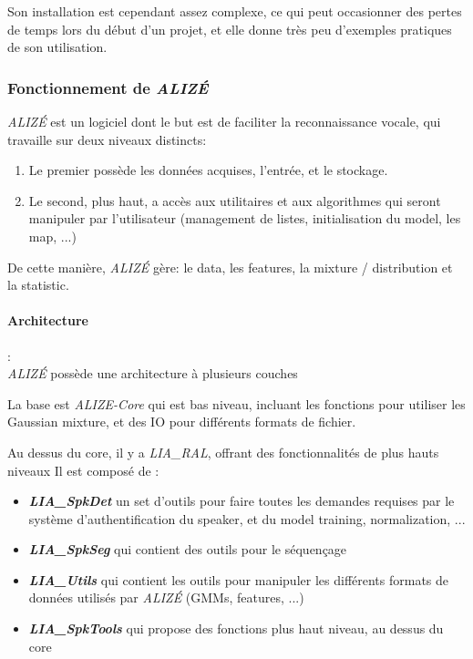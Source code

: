 Son installation est cependant assez complexe, ce qui peut occasionner des pertes de temps lors du début d'un projet, et elle donne très peu d'exemples pratiques de son utilisation.

\subsubsection*{Fonctionnement de \textit{ALIZÉ}}
\textit{ALIZÉ} est un logiciel dont le but est de faciliter la reconnaissance vocale, qui travaille sur deux niveaux distincts:
\begin{enumerate}
    \item Le premier possède les données acquises, l'entrée, et le stockage.
    \item Le second, plus haut, a accès aux utilitaires et aux algorithmes qui seront manipuler par l'utilisateur (management de listes, initialisation du model, les map, ...)
\end{enumerate}

De cette manière, \textit{ALIZÉ} gère: le data, les features,  la mixture / distribution et la statistic.

\paragraph*{Architecture} :\\

\textit{ALIZÉ} possède une architecture à plusieurs couches

La base est \textit{ALIZE-Core} qui est bas niveau, incluant les fonctions pour utiliser les Gaussian mixture, et des IO pour différents formats de fichier.

Au dessus du core, il y a \textit{LIA\_RAL}, offrant des fonctionnalités de plus hauts niveaux
Il est composé de :
\begin{itemize}
    \item \textbf{\textit{LIA\_SpkDet}}  un set d'outils pour faire toutes les demandes requises par le système d'authentification du speaker, et du model training, normalization, ...
    \item \textbf{\textit{LIA\_SpkSeg}}  qui contient des outils pour le séquençage
    \item \textbf{\textit{LIA\_Utils}}  qui contient les outils pour manipuler les différents formats de données utilisés par \textit{ALIZÉ} (GMMs, features, ...)
    \item \textbf{\textit{LIA\_SpkTools}}  qui propose des fonctions plus haut niveau, au dessus du core

\end{itemize}

